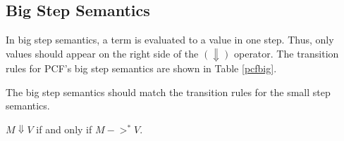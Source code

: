 \subsection{Big Step Semantics}

In big step semantics, a term is evaluated to a value in one step.  Thus, only values should appear on the right side of the $(\Downarrow)$ operator.  The transition rules for PCF's big step semantics are shown in Table \ref{pcfbig}.

The big step semantics should match the transition rules for the small step semantics.

\begin{theorem}
$M\Downarrow V$ if and only if $M ->^{*}V$.
\end{theorem}

\begin{table}
\begin{center}
\caption{Big Step Semantics For PCF} \label{pcfbig}
\end{center}
\end{table}

